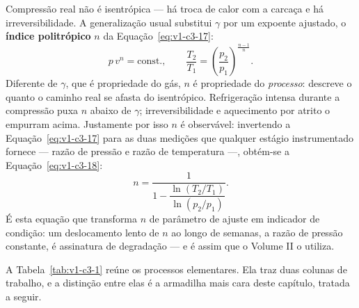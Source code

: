 \documentclass[12pt,a4paper]{article}
\numberwithin{equation}{section}
\numberwithin{table}{section}
\numberwithin{figure}{section}
\begin{document}
Compressão real não é isentrópica --- há troca de calor com a carcaça e há
irreversibilidade. A generalização usual substitui $\gamma$ por um expoente
ajustado, o \textbf{índice politrópico} $n$ da
Equação~\eqref{eq:v1-c3-17}:
\begin{equation}\label{eq:v1-c3-17}
p\,v^{n} = \text{const.},
\qquad
\frac{T_2}{T_1} = \left(\frac{p_2}{p_1}\right)^{\frac{n-1}{n}} .
\end{equation}
Diferente de $\gamma$, que é propriedade do gás, $n$ é propriedade do
\emph{processo}: descreve o quanto o caminho real se afasta do isentrópico.
Refrigeração intensa durante a compressão puxa $n$ abaixo de $\gamma$;
irreversibilidade e aquecimento por atrito o empurram acima. Justamente por
isso $n$ é observável: invertendo a Equação~\eqref{eq:v1-c3-17} para as duas
medições que qualquer estágio instrumentado fornece --- razão de pressão e
razão de temperatura ---, obtém-se a Equação~\eqref{eq:v1-c3-18}:
\begin{equation}\label{eq:v1-c3-18}
n = \frac{1}{1 - \dfrac{\ln(T_2/T_1)}{\ln(p_2/p_1)}} .
\end{equation}
É esta equação que transforma $n$ de parâmetro de ajuste em indicador de
condição: um deslocamento lento de $n$ ao longo de semanas, a razão de pressão
constante, é assinatura de degradação --- e é assim que o Volume II o utiliza.

A Tabela~\ref{tab:v1-c3-1} reúne os processos elementares. Ela traz duas
colunas de trabalho, e a distinção entre elas é a armadilha mais cara deste
capítulo, tratada a seguir.

\begin{table}[H]
\centering
\caption[Processos ideais para gás ideal]{Processos termodinâmicos ideais para
gás ideal, com o trabalho de sistema fechado ($\int p\,dv$) e o de escoamento
em regime permanente ($\int v\,dp$).}
\label{tab:v1-c3-1}
\small
{}
\end{table}
\end{document}
